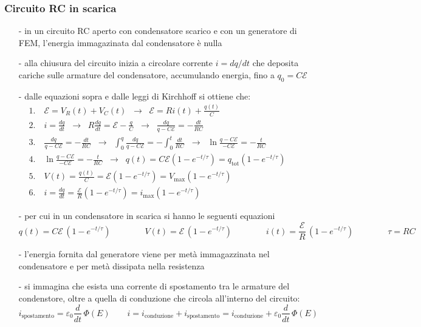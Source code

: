 \documentclass[a4paper]{article}
\newcommand\dt{\frac{d}{dt}\,}
\begin{document}
\subsubsection*{Circuito RC in scarica}
\begin{itemize}
	\item[-] in un circuito RC aperto con condensatore scarico e con un generatore di FEM, l'energia immagazinata dal
	condensatore è nulla
	\item[-] alla chiusura del circuito inizia a circolare corrente \(i = dq/dt\) che deposita cariche sulle armature del
	condensatore, accumulando energia, fino a \(q_0 = C \mathcal{E}\)
	\item[-] dalle equazioni sopra e dalle leggi di Kirchhoff si ottiene che:
	\begin{align*}
		&1. \quad \mathcal{E} = V_R(t) + V_C(t) \;\;\rightarrow\;\; \mathcal{E} = Ri(t) + \frac{q(t)}{C} \\
		&2. \quad i = \frac{dq}{dt} \;\;\rightarrow\;\; R \frac{dq}{dt} = \mathcal{E} -\frac{q}{C} \;\;\rightarrow\;\; \frac{dq}{q - C\mathcal{E}} = - \frac{dt}{RC} \\
		&3. \quad \frac{dq}{q - C\mathcal{E}} = - \frac{dt}{RC} \;\;\rightarrow\;\; \int_0^q \frac{dq}{q - C\mathcal{E}} = -\int_0^t \frac{dt}{RC} \;\;\rightarrow\;\; \ln \frac{q - C\mathcal{E}}{-C\mathcal{E}} = -\frac{t}{RC} \\
		&4. \quad \ln \frac{q - C\mathcal{E}}{-C\mathcal{E}} = -\frac{t}{RC}  \;\;\rightarrow\;\; q(t) = C \mathcal{E} (1-e^{-t/\tau}) = q_\text{tot} (1-e^{-t/\tau}) \\
		&5. \quad V(t) = \frac{q(t)}{C} = \mathcal{E} (1-e^{-t/\tau}) =  V_\text{max} (1-e^{-t/\tau}) \\
		&6. \quad i = \frac{dq}{dt} = \frac{\mathcal{E}}{R} (1-e^{-t/\tau}) = i_\text{max} (1-e^{-t/\tau}) \qquad\qquad\qquad\qquad\qquad\qquad\qquad\qquad
	\end{align*}
	\item[-] per cui in un condensatore in scarica si hanno le seguenti equazioni
	\[q(t) = C \mathcal{E} \, (1-e^{-t/\tau}) \qquad \qquad V(t) = \mathcal{E} \, (1-e^{-t/\tau}) \qquad \qquad i(t) = \frac{\mathcal{E}}{R} \, (1-e^{-t/\tau}) \qquad \qquad \tau = RC\]
	\item[-] l'energia fornita dal generatore viene per metà immagazzinata nel condensatore e per metà dissipata nella resistenza
	\item[-] si immagina che esista una corrente di spostamento tra le armature del condenstore, oltre a quella di conduzione che
	circola all'interno del circuito:
	\[i_\text{spostamento} = \varepsilon_0 \dt \Phi(E) \qquad i = i_\text{conduzione} + i_\text{spostamento} = i_\text{conduzione} + \varepsilon_0 \dt \Phi(E)\]
\end{itemize}
\end{document}
